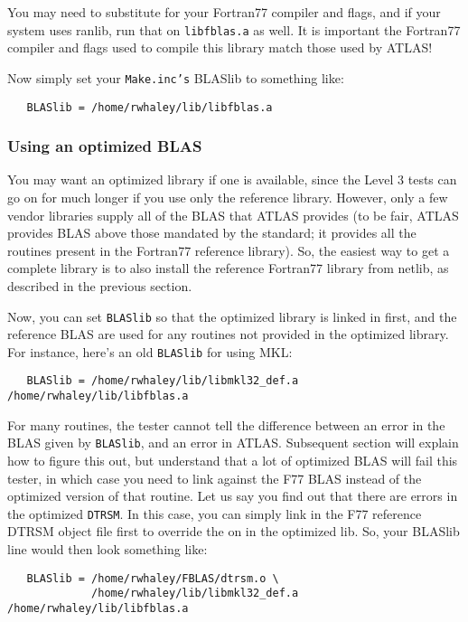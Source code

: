 \documentclass[11pt]{article}
\begin{document}
You may need to substitute for your Fortran77 compiler and flags, and if your
system uses ranlib, run that on {\tt libfblas.a} as well.  It is important
the Fortran77 compiler and flags used to compile this library match those
used by ATLAS!

Now simply set your {\tt Make.inc's} BLASlib to something like:
\vspace*{-0.1in}
\begin{verbatim}
   BLASlib = /home/rwhaley/lib/libfblas.a
\end{verbatim}

\subsubsection{Using an optimized BLAS}

You may want an optimized library if one
is available, since the Level 3 tests can go on for much longer if
you use only the reference library.  However, only a few vendor libraries
supply all of the BLAS that ATLAS provides (to be fair, ATLAS provides
BLAS above those mandated by the standard; it provides all the routines
present in the Fortran77 reference library).  So, the easiest way to
get a complete library is to also install the reference Fortran77 library
from netlib, as described in the previous section.

Now, you can  set {\tt BLASlib} so that the optimized library is linked in
first, and the reference BLAS are used for any routines not provided in
the optimized library.  For instance, here's an old {\tt BLASlib} for using
MKL:
\begin{verbatim}
   BLASlib = /home/rwhaley/lib/libmkl32_def.a /home/rwhaley/lib/libfblas.a
\end{verbatim}

For many routines, the tester cannot tell the difference between an error
in the BLAS given by {\tt BLASlib}, and an error in ATLAS.  Subsequent
section will explain how to figure this out, but understand that
a lot of optimized BLAS will fail this tester, in which case you need
to link against the F77 BLAS instead of the optimized version of that
routine.  Let us say you find out that there are errors in the
optimized {\tt DTRSM}.  In this case, you can simply link in the F77 reference
DTRSM object file first to override the on in the optimized lib.  So, your
BLASlib line would then look something like:
\begin{verbatim}
   BLASlib = /home/rwhaley/FBLAS/dtrsm.o \
             /home/rwhaley/lib/libmkl32_def.a /home/rwhaley/lib/libfblas.a
\end{verbatim}
\end{document}
